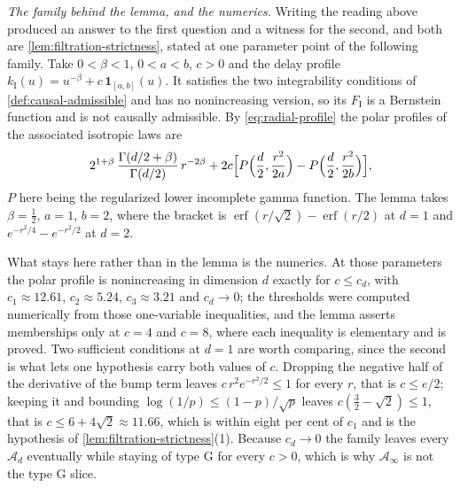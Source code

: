 \begin{remark}
\emph{The family behind the lemma, and the numerics.} Writing the reading above produced an
answer to the first question and a witness for the second, and both are
\ref{lem:filtration-strictness}, stated at one parameter point of the following family. Take
$0 < \beta < 1$, $0 < a < b$, $c > 0$ and the delay profile
$k_{\mathrm I}(u) = u^{-\beta} + c\,\mathbf{1}_{[a,b]}(u)$. It satisfies the two integrability
conditions of \ref{def:causal-admissible} and has no nonincreasing version, so its
$F_{\mathrm I}$ is a Bernstein function and is not causally admissible. By
\ref{eq:radial-profile} the polar profiles of the associated isotropic laws are
\[
  2^{1+\beta}\,\frac{\Gamma(d/2+\beta)}{\Gamma(d/2)}\,r^{-2\beta}
   + 2c\Bigl[P\Bigl(\frac d2,\frac{r^2}{2a}\Bigr)
            - P\Bigl(\frac d2,\frac{r^2}{2b}\Bigr)\Bigr],
\]
$P$ here being the regularized lower incomplete gamma function. The lemma takes
$\beta = \tfrac12$, $a = 1$, $b = 2$, where the bracket is
$\operatorname{erf}(r/\sqrt2) - \operatorname{erf}(r/2)$ at $d = 1$ and
$e^{-r^2/4} - e^{-r^2/2}$ at $d = 2$.

What stays here rather than in the lemma is the numerics. At those parameters the polar profile
is nonincreasing in dimension $d$ exactly for $c \le c_d$, with $c_1 \approx 12.61$,
$c_2 \approx 5.24$, $c_3 \approx 3.21$ and $c_d \to 0$; the thresholds were computed numerically
from those one-variable inequalities, and the lemma asserts memberships only at $c = 4$ and
$c = 8$, where each inequality is elementary and is proved. Two sufficient conditions at $d = 1$
are worth comparing, since the second is what lets one hypothesis carry both values of $c$.
Dropping the negative half of the derivative of the bump term leaves $c\,r^2e^{-r^2/2} \le 1$ for
every $r$, that is $c \le e/2$; keeping it and bounding $\log(1/p) \le (1-p)/\sqrt p$ leaves
$c(\tfrac32 - \sqrt2) \le 1$, that is $c \le 6 + 4\sqrt2 \approx 11.66$, which is within eight per
cent of $c_1$ and is the hypothesis of \ref{lem:filtration-strictness}(1). Because $c_d \to 0$ the
family leaves every $\mathcal{A}_d$ eventually while staying of type G for every $c > 0$, which is
why $\mathcal{A}_\infty$ is not the type G slice.
\end{remark}


